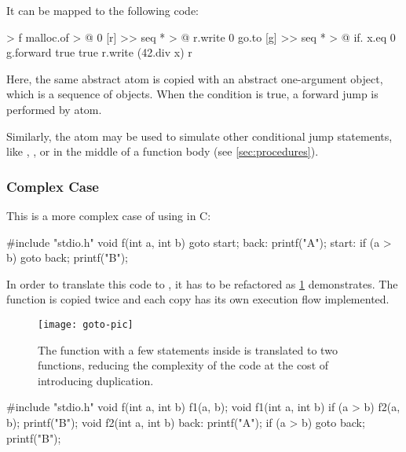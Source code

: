 \documentclass[sigplan,nonacm]{acmart}
\begin{document}
It can be mapped to the following \eolang{} code:

\begin{ffcode}
[x] > f
  malloc.of > @
    0
    [r] >>
      seq * > @
        r.write 0
        go.to
          [g] >>
            seq * > @
              if.
                x.eq 0
                g.forward true
                true
              r.write (42.div x)
        r
\end{ffcode}

Here, the same abstract atom  is copied with an abstract one-argument object, which is a sequence of objects.
When the condition is true, a forward jump is performed by  atom.

Similarly, the atom  may be used to simulate other conditional jump statements, like , , or  in the middle of a function body (see \cref{sec:procedures}).

\subsubsection{Complex Case}

This is a more complex case of using  in C:

\begin{ffcode}
#include "stdio.h"
void f(int a, int b) {
  goto start;
back:
  printf("A");
start:
  if (a > b) goto back;
  printf("B");
}
\end{ffcode}

In order to translate this code to \eolang{}, it has to be refactored as \cref{fig:goto} demonstrates.
The function  is copied twice and each copy has its own execution flow implemented.

\begin{figure}
\texttt{[image: goto-pic]}
\caption{The function  with a few  statements inside is translated to two functions, reducing the complexity of the code at the cost of introducing duplication.}
\label{fig:goto}
\end{figure}

\begin{ffcode}
#include "stdio.h"
void f(int a, int b) { f1(a, b); }
void f1(int a, int b) {
  if (a > b) f2(a, b);
  printf("B");
}
void f2(int a, int b) {
back:
  printf("A");
  if (a > b) goto back;
  printf("B");
}
\end{ffcode}
\end{document}

